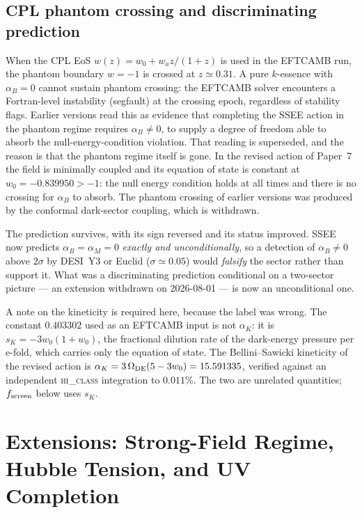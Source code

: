 \documentclass[12pt,a4paper]{article}
\newcommand{\wz}{w_0}
\newcommand{\wa}{w_a}
\newcommand{\alphaK}{\alpha_K}
\newcommand{\alphaB}{\alpha_B}
\newcommand{\alphaM}{\alpha_M}
\begin{document}
\subsection{CPL phantom crossing and discriminating prediction}
\label{sec:phantom}

When the CPL EoS $w(z) = \wz + \wa z/(1+z)$ is used in the EFTCAMB run,
the phantom boundary $w = -1$ is crossed at $z \simeq 0.31$.
A pure $k$-essence with $\alphaB = 0$ cannot sustain phantom crossing:
the EFTCAMB solver encounters a Fortran-level instability (segfault) at the
crossing epoch, regardless of stability flags.
Earlier versions read this as evidence that completing the SSEE action in the
phantom regime requires $\alphaB \neq 0$, to supply a degree of freedom able
to absorb the null-energy-condition violation.  That reading is superseded,
and the reason is that the phantom regime itself is gone.  In the revised
action of Paper~7 the field is minimally coupled and its equation of state is
constant at $\wz = -0.839950 > -1$: the null energy condition holds at all
times and there is no crossing for $\alphaB$ to absorb.  The phantom crossing
of earlier versions was produced by the conformal dark-sector coupling, which
is withdrawn.

The prediction survives, with its sign reversed and its status improved.
SSEE now predicts $\alphaB = \alphaM = 0$ \emph{exactly and
unconditionally}, so a detection of $\alphaB \neq 0$ above $2\sigma$ by
DESI~Y3 or Euclid ($\sigma \simeq 0.05$) would \emph{falsify} the sector
rather than support it.  What was a discriminating prediction conditional on
a two-sector picture --- an extension withdrawn on 2026-08-01 --- is now an
unconditional one.

A note on the kineticity is required here, because the label was wrong.  The
constant $0.403302$ used as an EFTCAMB input is not $\alphaK$: it is
$s_K = -3\wz(1+\wz)$, the fractional dilution rate of the dark-energy
pressure per e-fold, which carries only the equation of state.  The
Bellini--Sawicki kineticity of the revised action is
$\alphaK = 3\,\Omega_{\rm DE}(5-3\wz) = 15.591335$, verified against an
independent \textsc{hi\_class} integration to $0.011\%$.  The two are
unrelated quantities; $f_{\rm screen}$ below uses $s_K$.


\section{Extensions: Strong-Field Regime, Hubble Tension, and UV Completion}
\label{sec:extensions}
\end{document}
